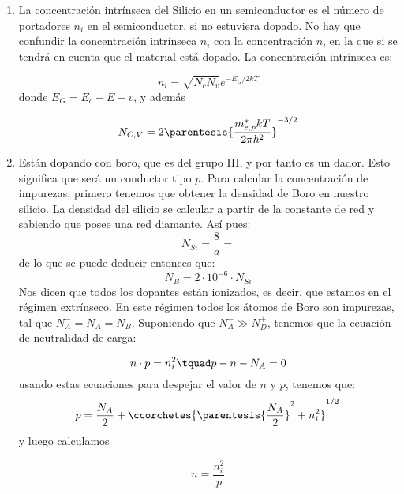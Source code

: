 	\begin{enumerate}[label=\alph*)]
		\item La concentración intrínseca del Silicio en un semiconductor es el número de portadores $n_i$ en el semiconductor, si no estuviera dopado. No hay que confundir la concentración intrínseca $n_i$ con la concentración $n$, en la que si se tendrá en cuenta que el material está dopado. La concentración intrínseca es:
		
		\begin{equation}
			n_i = \sqrt{N_cN_v} e^{-E_G/2kT}
		\end{equation}
		donde $E_G=E_c-E-v$, y además

		\begin{equation}
			N_{C,V} = 2 \parentesis{\frac{m_{e,p}^* kT}{2\pi\hbar^2}}^{-3/2}
		\end{equation}

		\item Están dopando con boro, que es del grupo III, y por tanto es un dador. Esto significa que será un conductor tipo $p$. Para calcular la concentración de impurezas, primero tenemos que obtener la densidad de Boro en nuestro silicio. La densidad del silicio se calcular a partir de la constante de red y sabiendo que posee una red diamante. Así pues:
		\begin{equation}
			N_{Si} = \frac{8}{a} =
		\end{equation}
		de lo que se puede deducir entonces que:
		\begin{equation}
			N_B = 2\cdot 10^{-6} \cdot N_{Si}
		\end{equation}
		Nos dicen que todos los dopantes están ionizados, es decir, que estamos en el régimen extrínseco. En este régimen todos los átomos de Boro son impurezas, tal que $N_A^-=N_A=N_B$. Suponiendo que $N_A^- \gg N_D^+$, tenemos que la ecuación de neutralidad de carga:

		\begin{equation}
			n\cdot p = n_i^2 \tquad p-n-N_A = 0
		\end{equation}
		usando estas ecuaciones para despejar el valor de $n$ y $p$, tenemos que:	
		\begin{equation}
			p = \frac{N_A}{2} + \ccorchetes{\parentesis{\frac{N_A}{2}}^2 + n_i^2}^{1/2}
		\end{equation}
		y luego calculamos

		\begin{equation}
			n = \frac{n_i^2}{p}
		\end{equation}


\end{enumerate}
